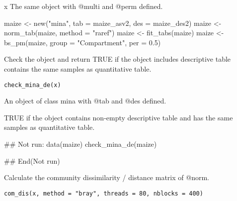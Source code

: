 \documentclass[a4paper]{book}
\begin{document}
%
\begin{Value}
x The same object with @multi and @perm defined.
\end{Value}
%
\begin{Examples}
\begin{ExampleCode}
maize <- new("mina", tab = maize_asv2, des = maize_des2)
maize <- norm_tab(maize, method = "raref")
maize <- fit_tabs(maize)
maize <- bs_pm(maize, group = "Compartment", per = 0.5)
\end{ExampleCode}
\end{Examples}
%
\begin{Description}\relax
Check the object and return TRUE if the object includes descriptive table
contains the same samples as quantitative table.
\end{Description}
%
\begin{Usage}
\begin{verbatim}
check_mina_de(x)
\end{verbatim}
\end{Usage}
%
\begin{Arguments}
\begin{ldescription}
\item[\code{x}] An object of class mina with @tab and @des defined.
\end{ldescription}
\end{Arguments}
%
\begin{Value}
TRUE if the object contains non-empty descriptive table and has the
same samples as quantitative table.
\end{Value}
%
\begin{Examples}
\begin{ExampleCode}
## Not run: 
data(maize)
check_mina_de(maize)

## End(Not run)
\end{ExampleCode}
\end{Examples}
%
\begin{Description}\relax
Calculate the community dissimilarity / distance matrix of @norm.
\end{Description}
%
\begin{Usage}
\begin{verbatim}
com_dis(x, method = "bray", threads = 80, nblocks = 400)
\end{verbatim}
\end{Usage}
\end{document}
